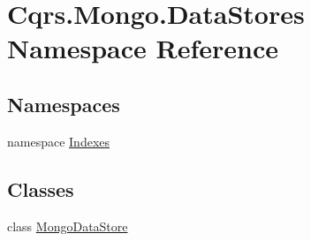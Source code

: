 \hypertarget{namespaceCqrs_1_1Mongo_1_1DataStores}{}\section{Cqrs.\+Mongo.\+Data\+Stores Namespace Reference}
\label{namespaceCqrs_1_1Mongo_1_1DataStores}
\subsection*{Namespaces}
\begin{DoxyCompactItemize}
\item 
namespace \hyperlink{namespaceCqrs_1_1Mongo_1_1DataStores_1_1Indexes}{Indexes}
\end{DoxyCompactItemize}
\subsection*{Classes}
\begin{DoxyCompactItemize}
\item 
class \hyperlink{classCqrs_1_1Mongo_1_1DataStores_1_1MongoDataStore}{Mongo\+Data\+Store}
\end{DoxyCompactItemize}

